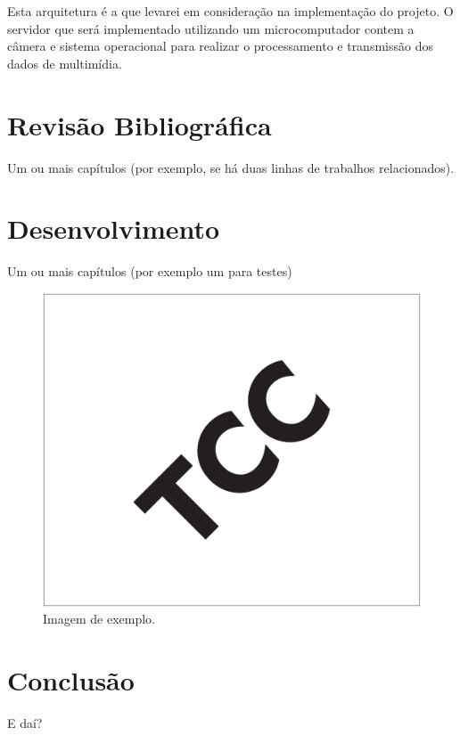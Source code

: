 \documentclass[12pt, %
openright, 
oneside, %
a4paper,    %
brazil]{facom-ufu-abntex2}
\begin{document}
Esta arquitetura é a que levarei em consideração na implementação do projeto. O servidor que será implementado utilizando
um microcomputador contem a câmera e sistema operacional para realizar o processamento e transmissão dos dados de 
multimídia.



\chapter{Revisão Bibliográfica}
Um ou mais capítulos (por exemplo, se há duas linhas de trabalhos relacionados).



\chapter{Desenvolvimento}
Um ou mais capítulos (por exemplo um para testes)


\begin{figure}[!ht]
    \centering
	\includegraphics[width=0.55\linewidth]{imagemExemplo.pdf}
	\caption[Isso é o que aparece no sumário]{Imagem de exemplo.}
	\label{fig:graficosVariandoTamanhoRede}
\end{figure}



\chapter[Conclusão]{Conclusão}
E daí?





\postextual



\end{document}
